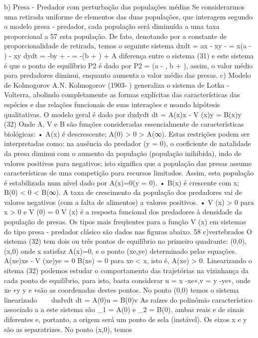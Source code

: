 {{{{{{{{{{{{{{{{{{{{b) Presa - Predador com perturbação das populações médias 
Se considerarmos uma retirada uniforme de elementos das duas populações, que interagem segundo o modelo presa - predador, cada população será diminuída a uma taxa proporcional a 
57 
esta população. De fato, denotando por \epsilon a constante de proporcionalidade de retirada, temos o seguinte sistema 
dxdt = ax - \alpha xy - \epsilonx = x(a - \epsilon) - \alpha xy dydt = -by + \betaxy - \epsilony = -(b + \epsilon) + \betaxy A diferença entre o sistema (31) e este sistema é que o ponto de equilíbrio P2 é dado por 
P2 = 
(a - \alpha  \epsilon 
, b + \beta 
\epsilon 
), assim, o valor médio para predadores diminui, enquanto aumenta o valor 
médio das presas. 
c) Modelo de Kolmogorov 
A.N. Kolmogorov (1903- ) generaliza o sistema de Lotka - Volterra, abolindo completamente as formas explícitas das características das espécies e das relações funcionais de suas interações e usando hipótesis qualitativas. O modelo geral é dado por 
dxdydt dt = A(x)x - V (x)y 
= B(x)y 
(32) 
Onde A, V e B são funções consideradas essencialmente de características biológicas: 
• A(x) é descrescente; A(0) > 0 > A(∞). Estas restrições podem ser interpretadas como: na ausência do predador (y = 0), o coeficiente de natalidade da presa diminui com o aumento da população (população inihibida), indo de valores positivos para negativos; isto significa que a população das presas assume características de uma competição para recursos limitados. Assim, esta população é estabilizada num nível dado por A(x)=0(y = 0). 
• B(x) é crescente com x; B(0) < 0 < B(∞). A taxa de crescimento da população dos predadores vai de valores negativos (com a falta de alimentos) a valores positivos. 
• V (x) > 0 para x > 0 e V (0) = 0 V (x) é a resposta funcional dos predadores à densidade da população de presas. Os tipos mais freqüentes para a função V (x) em sistemas do tipo presa - predador clásico são dados nas figuras abaixo. 
58 
c)vertebrados 
O sistema (32) tem dois ou três pontos de equilíbrio no primeiro quadrante: (0,0), (x,0) onde x satisfaz A(x)=0, e o ponto (xe,ye) determinado pelas equações. 
{ A(xe)xe - V (xe)ye = 0 B(xe) = 0 para xe < x, isto é, A(xe) > 0. 
Linearizando o sitema (32) podemos estudar o comportamento das trajetórias na vizinhança da cada ponto de equilíbrio, para isto, basta considerar u = x -xe∗,v = y -ye∗, onde xe ∗y y e ∗são as coordenadas destes pontos. 
No ponto (0,0) temos o sistema linearizado 
 
dudvdt dt = A(0)u = B(0)v 
As raízes do polinômio característico associado a a este sistema são \lambda_{1} = A(0) e \lambda_{2} = B(0), ambas reais e de sinais diferentes e, portanto, a origem será um ponto de sela (instável). Os eixos x e y são as separatrizes. No ponto (x,0), temos 
}}}}}}}}}}}}}}}}}}}}}
